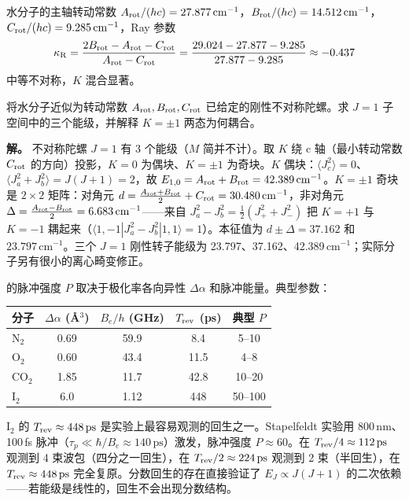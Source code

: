水分子的主轴转动常数 \(A_{\rm rot}/(hc)=27.877\,\mathrm{cm}^{-1}\)，\(B_{\rm rot}/(hc)=14.512\,\mathrm{cm}^{-1}\)，\(C_{\rm rot}/(hc)=9.285\,\mathrm{cm}^{-1}\)，Ray 参数
\[
\kappa_{\rm R}=\frac{2B_{\rm rot}-A_{\rm rot}-C_{\rm rot}}{A_{\rm rot}-C_{\rm rot}}
=\frac{29.024-27.877-9.285}{27.877-9.285}\approx-0.437
\]
中等不对称，\(K\) 混合显著。

\begin{exbox}[\(J=1\) 水分子能级]
将水分子近似为转动常数 $A_{\rm rot},B_{\rm rot},C_{\rm rot}$ 已给定的刚性不对称陀螺。求 $J=1$ 子空间中的三个能级，并解释 $K=\pm1$ 两态为何耦合。

\textbf{解。} 不对称陀螺 \(J=1\) 有 3 个能级（\(M\) 简并不计）。取 \(K\) 绕 c 轴（最小转动常数 \(C_{\rm rot}\) 的方向）投影，\(K=0\) 为偶块、\(K=\pm1\) 为奇块。\(K\) 偶块：\(\langle J_c^2\rangle=0\)、\(\langle J_a^2+J_b^2\rangle=J(J+1)=2\)，故 \(E_{1,0}=A_{\rm rot}+B_{\rm rot}=42.389\,\mathrm{cm}^{-1}\)。\(K=\pm1\) 奇块是 \(2\times2\) 矩阵：对角元 \(d=\frac{A_{\rm rot}+B_{\rm rot}}{2}+C_{\rm rot}=30.480\,\mathrm{cm}^{-1}\)，非对角元 \(\Delta=\frac{A_{\rm rot}-B_{\rm rot}}{2}=6.683\,\mathrm{cm}^{-1}\)——来自 \(J_a^2-J_b^2=\frac12(J_+^2+J_-^2)\) 把 \(K=+1\) 与 \(K=-1\) 耦起来（\(\langle 1,-1|J_a^2-J_b^2|1,1\rangle=1\)）。本征值为 \(d\pm\Delta=37.162\) 和 \(23.797\,\mathrm{cm}^{-1}\)。三个 \(J=1\) 刚性转子能级为 23.797、37.162、42.389\,\(\mathrm{cm}^{-1}\)；实际分子另有很小的离心畸变修正。
\end{exbox}

 的脉冲强度 \(P\) 取决于极化率各向异性 \(\Delta\alpha\) 和脉冲能量。典型参数：

\begin{center}
\begin{tabular}{lcccc}
\hline
分子 & \(\Delta\alpha\) (\AA\(^3\)) & \(B_e/h\) (GHz) & \(T_{\rm rev}\) (ps) & 典型 \(P\) \\
\hline
N\(_2\) & 0.69 & 59.9 & 8.4 & 5--10 \\
O\(_2\) & 0.60 & 43.4 & 11.5 & 4--8 \\
CO\(_2\) & 1.85 & 11.7 & 42.8 & 10--20 \\
I\(_2\) & 6.0 & 1.12 & 448 & 50--100 \\
\hline
\end{tabular}
\end{center}


I\(_2\) 的 \(T_{\rm rev}\approx448\,\mathrm{ps}\) 是实验上最容易观测的回生之一。Stapelfeldt 实验用 800\,nm、100\,fs 脉冲（\(\tau_p\ll\hbar/B_e\approx140\,\mathrm{ps}\)）激发，脉冲强度 \(P\approx60\)。在 \(T_{\rm rev}/4\approx112\,\mathrm{ps}\) 观测到 4 束波包（四分之一回生），在 \(T_{\rm rev}/2\approx224\,\mathrm{ps}\) 观测到 2 束（半回生），在 \(T_{\rm rev}\approx448\,\mathrm{ps}\) 完全复原。分数回生的存在直接验证了 \(E_J\propto J(J+1)\) 的二次依赖——若能级是线性的，回生不会出现分数结构。


